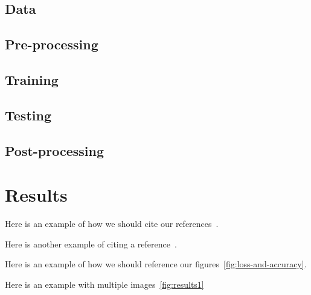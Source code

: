 \documentclass[conference]{IEEEtran}
\begin{document}
    \subsection{Data}\label{subsec:data}
    \subsection{Pre-processing}\label{subsec:pre-processing}
    \subsection{Training}\label{subsec:training}
    \subsection{Testing}\label{subsec:testing}
    \subsection{Post-processing}\label{subsec:post-processing}
    \section{Results}\label{sec:results}

    Here is an example of how we should cite our references~\cite{e-in-style}.

    Here is another example of citing a reference~\cite{pytorch-generative-model-collections}.

    Here is an example of how we should reference our figures~\autoref{fig:loss-and-accuracy}.

    Here is an example with multiple images~\autoref{fig:results1}
\end{document}

